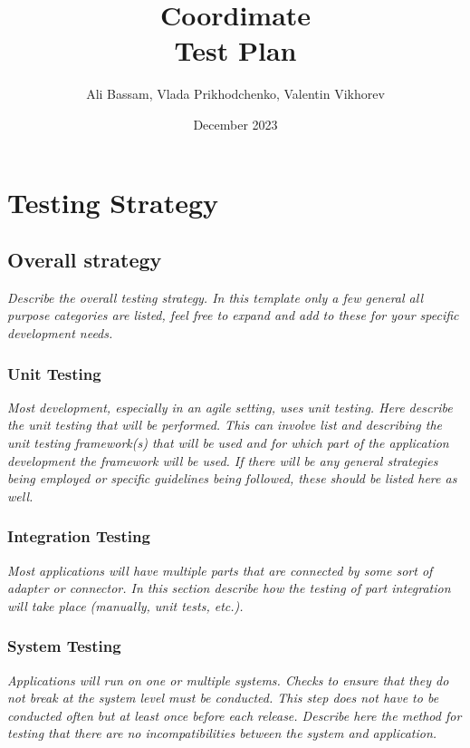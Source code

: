 \documentclass{article}
\title{Coordimate\\Test Plan}
\date{December 2023}
\author{Ali Bassam, Vlada Prikhodchenko, Valentin Vikhorev}
\begin{document}
\maketitle

\section{Testing Strategy}

\subsection{Overall strategy}

\textit{Describe the overall testing strategy. In this
template only a few general all purpose categories are listed, feel free to
expand and add to these for your specific development needs.}

\subsubsection{Unit Testing}

\textit{Most development, especially in an agile setting,
uses unit testing. Here describe the unit testing that will be performed. This
can involve list and describing the unit testing framework(s) that will be used
and for which part of the application development the framework will be used.
If there will be any general strategies being employed or specific guidelines
being followed, these should be listed here as well.}

\subsubsection{Integration Testing}

\textit{Most applications will have multiple
parts that are connected by some sort of adapter or connector. In this section
describe how the testing of part integration will take place (manually, unit
tests, etc.).}

\subsubsection{System Testing}

\textit{Applications will run on one or multiple
systems. Checks to ensure that they do not break at the system level must be
conducted. This step does not have to be conducted often but at least once
before each release. Describe here the method for testing that there are no
incompatibilities between the system and application.}
\end{document}
